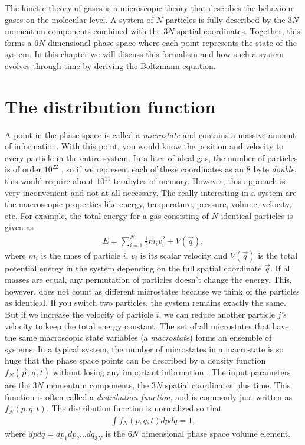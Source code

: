 The kinetic theory of gases is a microscopic theory that describes the behaviour gases on the molecular level. A system of $N$ particles is fully described by the $3N$ momentum components combined with the $3N$ spatial coordinates. Together, this forms a $6N$ dimensional phase space where each point represents the state of the system. In this chapter we will discuss this formalism and how such a system evolves through time by deriving the Boltzmann equation. 

\section{The distribution function}
A point in the phase space is called a \textit{microstate} and contains a massive amount of information. With this point, you would know the position and velocity to every particle in the entire system. In a liter of ideal gas, the number of particles is of order $10^{22}$ \cite{lien2001generell}, so if we represent each of these coordinates as an 8 byte \textit{double}, this would require about $10^{11}$ terabytes of memory. However, this approach is very inconvenient and not at all necessary. The really interesting in a system are the macroscopic properties like energy, temperature, pressure, volume, velocity, etc. For example, the total energy for a gas consisting of $N$ identical particles is given as
\begin{align*}
	E = \sum_{i=1}^N \frac{1}{2} m_i v_i^2 + V(\vec q),
\end{align*}
where $m_i$ is the mass of particle $i$, $v_i$ is its scalar velocity and $V(\vec q)$ is the total potential energy in the system depending on the full spatial coordinate $\vec q$. If all masses are equal, any permutation of particles doesn't change the energy. This, however, does not count as different microstates because we think of the particles as identical. If you switch two particles, the system remains exactly the same. But if we increase the velocity of particle $i$, we can reduce another particle $j$'s velocity to keep the total energy constant. The set of all microstates that have the same macroscopic state variables (a \textit{macrostate}) forms an ensemble of systems. In a typical system, the number of microstates in a macrostate is so huge that the phase space points can be described by a density function $f_N(\vec p, \vec q, t)$ without losing any important information \cite{mcquarrie1973statistical}. The input parameters are the $3N$ momentum components, the $3N$ spatial coordinates plus time. This function is often called a \textit{distribution function}, and is commonly just written as $f_N(p, q, t)$. The distribution function is normalized so that
\begin{align}
	\int f_N(p, q, t) dpdq = 1,
\end{align}
where $dpdq=dp_1dp_2...dq_{3N}$ is the $6N$ dimensional phase space volume element. 

